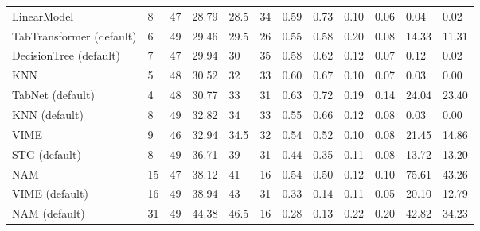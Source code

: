 \begin{tabular}{lllllrllllll}
LinearModel & 8 & 47 & 28.79 & 28.5 & 34 & 0.59 & 0.73 & 0.10 & 0.06 & 0.04 & 0.02 \\
TabTransformer (default) & 6 & 49 & 29.46 & 29.5 & 26 & 0.55 & 0.58 & 0.20 & 0.08 & 14.33 & 11.31 \\
DecisionTree (default) & 7 & 47 & 29.94 & 30 & 35 & 0.58 & 0.62 & 0.12 & 0.07 & 0.12 & 0.02 \\
KNN & 5 & 48 & 30.52 & 32 & 33 & 0.60 & 0.67 & 0.10 & 0.07 & 0.03 & 0.00 \\
TabNet (default) & 4 & 48 & 30.77 & 33 & 31 & 0.63 & 0.72 & 0.19 & 0.14 & 24.04 & 23.40 \\
KNN (default) & 8 & 49 & 32.82 & 34 & 33 & 0.55 & 0.66 & 0.12 & 0.08 & 0.03 & 0.00 \\
VIME & 9 & 46 & 32.94 & 34.5 & 32 & 0.54 & 0.52 & 0.10 & 0.08 & 21.45 & 14.86 \\
STG (default) & 8 & 49 & 36.71 & 39 & 31 & 0.44 & 0.35 & 0.11 & 0.08 & 13.72 & 13.20 \\
NAM & 15 & 47 & 38.12 & 41 & 16 & 0.54 & 0.50 & 0.12 & 0.10 & 75.61 & 43.26 \\
VIME (default) & 16 & 49 & 38.94 & 43 & 31 & 0.33 & 0.14 & 0.11 & 0.05 & 20.10 & 12.79 \\
NAM (default) & 31 & 49 & 44.38 & 46.5 & 16 & 0.28 & 0.13 & 0.22 & 0.20 & 42.82 & 34.23 \\
\bottomrule
\end{tabular}
